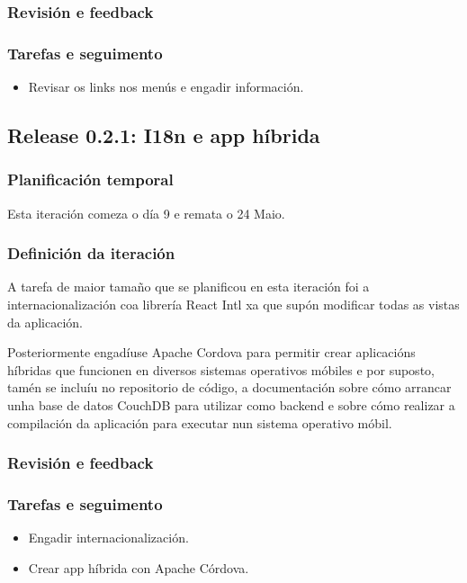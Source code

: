       \subsubsection{Revisión e feedback}

      \subsubsection{Tarefas e seguimento}
        \begin{itemize}
        \item Revisar os links nos menús e engadir información.
        \end{itemize}


    \subsection{Release 0.2.1: I18n e app híbrida}

      \subsubsection{Planificación temporal}
      Esta iteración comeza o día 9 e remata o 24 Maio.

      \subsubsection{Definición da iteración}
      A tarefa de maior tamaño que se planificou en esta iteración foi a 
internacionalización coa librería React Intl xa que supón modificar todas as 
vistas da aplicación.

      Posteriormente engadíuse Apache Cordova para permitir crear aplicacións 
híbridas que funcionen en diversos sistemas operativos móbiles e por suposto, 
tamén se incluíu no repositorio de código, a documentación sobre cómo arrancar 
unha base de datos CouchDB para utilizar como backend e sobre cómo realizar a 
compilación da aplicación para executar nun sistema operativo móbil.

      \subsubsection{Revisión e feedback}

      \subsubsection{Tarefas e seguimento}
        \begin{itemize}
        \item Engadir internacionalización.
        \item Crear app híbrida con Apache Córdova.
        \end{itemize}
%
%
